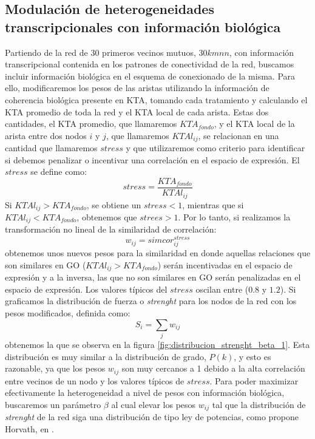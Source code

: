 \subsection{Modulación de heterogeneidades transcripcionales con información biológica}
Partiendo de la red de 30 primeros vecinos mutuos, $30kmnn$, con información transcripcional contenida en los patrones de conectividad de la red, buscamos incluir información biológica en el esquema de conexionado de la misma. Para ello, modificaremos los pesos de las aristas utilizando la información de coherencia biológica presente en KTA, tomando cada tratamiento y calculando el KTA promedio de toda la red y el KTA local de cada arista. Estas dos cantidades, el KTA promedio, que llamaremos $KTA_{fondo}$, y el KTA local de la arista entre dos nodos $i$ y $j$, que llamaremos $KTAl_{ij}$, se relacionan en una cantidad que llamaremos $stress$ y que utilizaremos como criterio para identificar si debemos penalizar o incentivar una correlación en el espacio de expresión. El $stress$ se define como:
\begin{equation}
	stress = \frac{KTA_{fondo}}{KTAl_{ij}}
\end{equation}
Si $KTAl_{ij} > KTA_{fondo}$, se obtiene un $stress < 1$, mientras que si $KTAl_{ij} < KTA_{fondo}$, obtenemos que $strees > 1$. Por lo tanto, si realizamos la transformación no lineal de la similaridad de correlación:
\begin{equation}
	w_{ij} = simcor_{ij}^{stress}
	\label{eq:stress}
\end{equation}
obtenemos unos nuevos pesos para la similaridad en donde aquellas relaciones que son similares en GO ($KTAl_{ij} > KTA_{fondo}$) serán incentivadas en el espacio de expresión y a la inversa, las que no son similares en GO serán penalizadas en el espacio de expresión. Los valores típicos del $stress$ oscilan entre ($0.8$ y $1.2$). Si graficamos la distribución de fuerza o \textit{strenght} para los nodos de la red con los pesos modificados, definida como:
\begin{equation}
	S_i = \sum_j w_{ij}
	\label{eq:strength}
\end{equation}
obtenemos la que se observa en la figura \ref{fig:distribucion_strenght_beta_1}. Esta distribución es muy similar a la distribución de grado, $P(k)$, y esto es razonable, ya que los pesos $w_{ij}$ son muy cercanos a 1 debido a la alta correlación entre vecinos de un nodo y los valores típicos de $stress$. Para poder maximizar efectivamente la heterogeneidad a nivel de pesos con información biológica, buscaremos un parámetro $\beta$ al cual elevar los pesos $w_{ij}$ tal que la distribución de \textit{strenght} de la red siga una distribución de tipo ley de potencias, como propone Horvath, en \cite{Horvath2005}.\\

